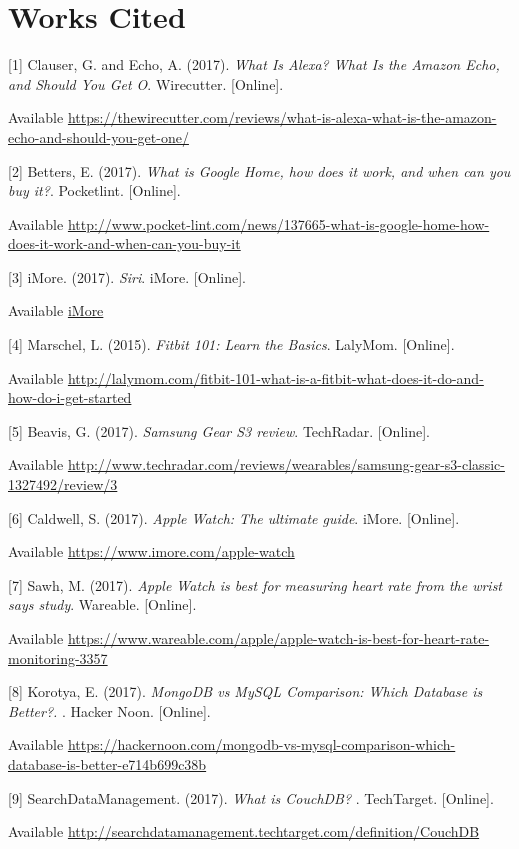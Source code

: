 \documentclass[onecolumn, draftclsnofoot,10pt, compsoc]{IEEEtran}
\begin{document}
	
\section{Works Cited}

[1] Clauser, G. and Echo, A. (2017). \textit{What Is Alexa? What Is the Amazon Echo, and Should You Get O}. Wirecutter. [Online].

Available \url{https://thewirecutter.com/reviews/what-is-alexa-what-is-the-amazon-echo-and-should-you-get-one/}


[2] Betters, E.  (2017). \textit{What is Google Home, how does it work, and when can you buy it?}. Pocketlint. [Online].

Available \url{http://www.pocket-lint.com/news/137665-what-is-google-home-how-does-it-work-and-when-can-you-buy-it}


[3] iMore. (2017). \textit{Siri}. iMore. [Online]. 

Available \url{iMore}


[4]	Marschel, L. (2015). \textit{Fitbit 101: Learn the Basics}. LalyMom. [Online]. 

Available \url{http://lalymom.com/fitbit-101-what-is-a-fitbit-what-does-it-do-and-how-do-i-get-started}


[5] Beavis, G. (2017). \textit{Samsung Gear S3 review}. TechRadar. [Online]. 

Available \url{http://www.techradar.com/reviews/wearables/samsung-gear-s3-classic-1327492/review/3}

[6]	Caldwell, S. (2017).  \textit{Apple Watch: The ultimate guide}. iMore. [Online]. 

Available \url{https://www.imore.com/apple-watch}


[7]	Sawh, M. (2017).  \textit{Apple Watch is best for measuring heart rate from the wrist says study}. Wareable. [Online]. 

Available \url{https://www.wareable.com/apple/apple-watch-is-best-for-heart-rate-monitoring-3357}


[8]	Korotya, E. (2017).  \textit{MongoDB vs MySQL Comparison: Which Database is Better?. }. Hacker Noon. [Online]. 

Available \url{https://hackernoon.com/mongodb-vs-mysql-comparison-which-database-is-better-e714b699c38b}


[9]	SearchDataManagement. (2017). \textit{What is CouchDB? }. TechTarget. [Online]. 

Available \url{http://searchdatamanagement.techtarget.com/definition/CouchDB}
\end{document}
